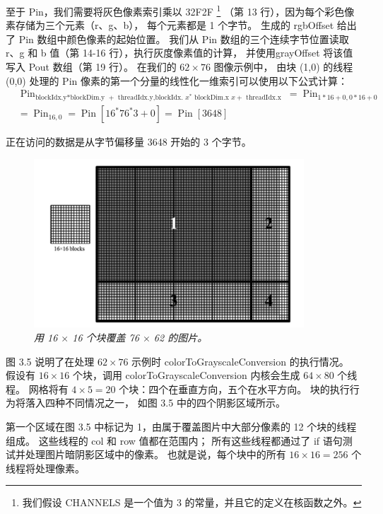 至于 Pin，我们需要将灰色像素索引乘以 32F2F
\footnote{我们假设 CHANNELS 是一个值为 3 的常量，并且它的定义在核函数之外。}
（第 13 行），因为每个彩色像素存储为三个元素（r、g、b），
每个元素都是 1 个字节。 生成的 rgbOffset 给出了 Pin 数组中颜色像素的起始位置。 
我们从 Pin 数组的三个连续字节位置读取 r、g 和 b 值（第 14-16 行），执行灰度像素值的计算，
并使用grayOffset 将该值写入 Pout 数组（第 19 行）。 在我们的 $62 \times 76$ 图像示例中，
由块 (1,0) 的线程 (0,0) 处理的 Pin 像素的第一个分量的线性化一维索引可以使用以下公式计算：
$$
\begin{aligned}
& \operatorname{Pin}_{\text {blockIdx.y*blockDim.y }+ \text { threadIdx.y,blockIdx. } x^{*} \text { blockDim.x } x+\text { threadIdx.x }}=\operatorname{Pin}_{1 * 16+0,0 * 16+0} \\
& =\operatorname{Pin}_{16,0}=\operatorname{Pin}\left[16^{*} 76^{*} 3+0\right]=\operatorname{Pin}[3648]
\end{aligned}
$$

正在访问的数据是从字节偏移量 3648 开始的 3 个字节。

\begin{figure}[H]
	\centering
	\includegraphics[width=0.9\textwidth]{figs/F3.5.png}
	\caption{\textit{用 16 $\times$ 16 个块覆盖 76 $\times$ 62 的图片。}}
\end{figure}

图 3.5 说明了在处理 $62 \times 76$ 示例时 colorToGrayscaleConversion 的执行情况。 
假设有 $16 \times 16$ 个块，调用 colorToGrayscaleConversion 内核会生成 $64 \times 80$ 个线程。 
网格将有 $4 \times 5 = 20$ 个块：四个在垂直方向，五个在水平方向。 块的执行行为将落入四种不同情况之一，
如图 3.5 中的四个阴影区域所示。

第一个区域在图 3.5 中标记为 1，由属于覆盖图片中大部分像素的 12 个块的线程组成。 这些线程的 col 和 row 值都在范围内； 
所有这些线程都通过了 if 语句测试并处理图片暗阴影区域中的像素。 
也就是说，每个块中的所有 $16 \times 16 = 256$ 个线程将处理像素。

